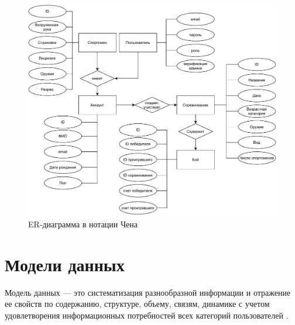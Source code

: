 \begin{figure}[H]
\includegraphics[width=1\columnwidth]{assets/er.drawio.pdf}
\centering
\caption{ER-диаграмма в нотации Чена}
\label{ris:er}
\end{figure}

\section{Модели данных}

Модель данных --- это систематизация разнообразной информации и отражение ее свойств по содержанию, структуре, объему, связям, динамике с учетом удовлетворения информационных потребностей всех категорий пользователей \cite{models}.

